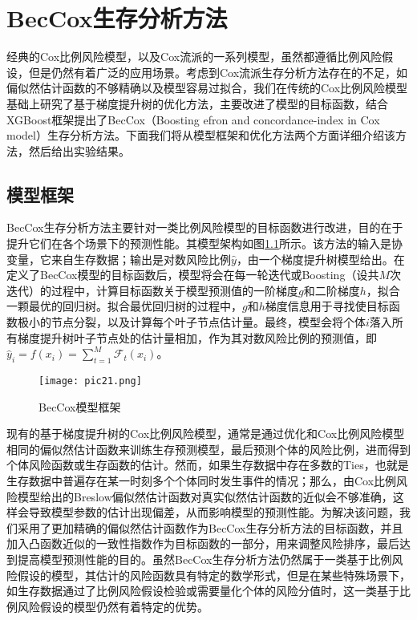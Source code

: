 \chapter{BecCox生存分析方法}

经典的Cox比例风险模型，以及Cox流派的一系列模型，虽然都遵循比例风险假设，但是仍然有着广泛的应用场景。考虑到Cox流派生存分析方法存在的不足，如偏似然估计函数的不够精确以及模型容易过拟合，我们在传统的Cox比例风险模型基础上研究了基于梯度提升树的优化方法，主要改进了模型的目标函数，结合XGBoost框架提出了BecCox（Boosting efron and concordance-index in Cox model）生存分析方法。下面我们将从模型框架和优化方法两个方面详细介绍该方法，然后给出实验结果。

\section{模型框架}

BecCox生存分析方法主要针对一类比例风险模型的目标函数进行改进，目的在于提升它们在各个场景下的预测性能。其模型架构如图\ref{pic21}所示。该方法的输入是协变量，它来自生存数据；输出是对数风险比例$\hat{y}$，由一个梯度提升树模型给出。在定义了BecCox模型的目标函数后，模型将会在每一轮迭代或Boosting（设共$M$次迭代）的过程中，计算目标函数关于模型预测值的一阶梯度$g$和二阶梯度$h$，拟合一颗最优的回归树。拟合最优回归树的过程中，$g$和$h$梯度信息用于寻找使目标函数极小的节点分裂，以及计算每个叶子节点估计量。最终，模型会将个体$i$落入所有梯度提升树叶子节点处的估计量相加，作为其对数风险比例的预测值，即$\hat{y}_i = f(x_i) = \sum_{t=1}^{M} \mathcal{F}_t (x_i)$。

\begin{figure}[H]
\texttt{[image: pic21.png]}
\caption{BecCox模型框架}
\label{pic21}
\end{figure}

现有的基于梯度提升树的Cox比例风险模型，通常是通过优化和Cox比例风险模型相同的偏似然估计函数来训练生存预测模型，最后预测个体的风险比例，进而得到个体风险函数或生存函数的估计。然而，如果生存数据中存在多数的Ties，也就是生存数据中普遍存在某一时刻多个个体同时发生事件的情况；那么，由Cox比例风险模型给出的Breslow偏似然估计函数对真实似然估计函数的近似会不够准确，这样会导致模型参数的估计出现偏差，从而影响模型的预测性能。为解决该问题，我们采用了更加精确的偏似然估计函数作为BecCox生存分析方法的目标函数，并且加入凸函数近似的一致性指数作为目标函数的一部分，用来调整风险排序，最后达到提高模型预测性能的目的。虽然BecCox生存分析方法仍然属于一类基于比例风险假设的模型，其估计的风险函数具有特定的数学形式，但是在某些特殊场景下，如生存数据通过了比例风险假设检验或需要量化个体的风险分值时，这一类基于比例风险假设的模型仍然有着特定的优势。

